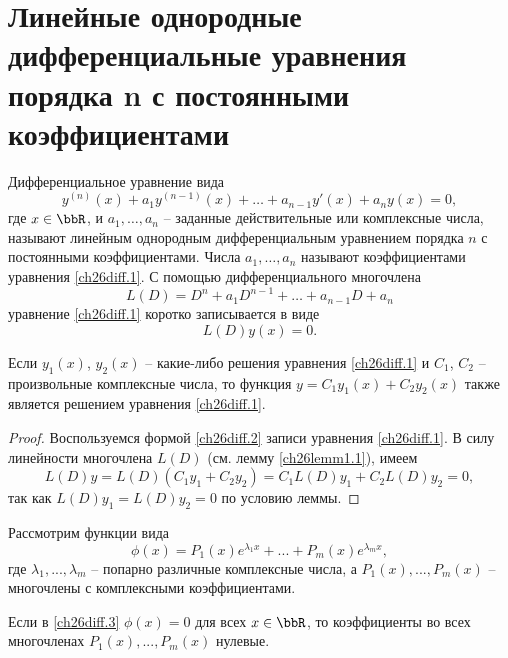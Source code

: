 \section{Линейные однородные дифференциальные уравнения порядка n с постоянными коэффициентами}

Дифференциальное уравнение вида
\begin{equation}\label{ch26diff.1}
y^{(n)}(x)+a_1y^{(n-1)}(x)+\dots+a_{n-1}y'(x)+a_ny(x)=0,
\end{equation}
где $x\in \bbR$, и $a_1,\dots,a_n$ -- заданные действительные или комплексные числа, называют линейным однородным дифференциальным уравнением порядка $n$ с постоянными коэффициентами. Числа $a_1,\dots,a_n$ называют коэффициентами уравнения \eqref{ch26diff.1}.
С помощью дифференциального многочлена 
$$
L(D)= D^n+a_1D^{n-1}+\dots+a_{n-1}D+a_n
$$
уравнение \eqref{ch26diff.1} коротко записывается в виде
\begin{equation} \label{ch26diff.2}
L(D)y(x)=0.
\end{equation} 

\begin{lemm} \label{ch26lemm2.1}
Если $y_1(x)$, $y_2(x)$ -- какие-либо решения уравнения \eqref{ch26diff.1}  и $C_1$, $C_2$ -- произвольные комплексные числа, то функция $y=C_1y_1(x)+C_2y_2(x)$ также является решением уравнения \eqref{ch26diff.1}.
\end{lemm}

\begin{proof}
Воспользуемся формой \eqref{ch26diff.2} записи уравнения \eqref{ch26diff.1}. В силу линейности многочлена $L(D)$ (см. лемму \ref{ch26lemm1.1}), имеем
$$
L(D)y=L(D)(C_1y_1+C_2y_2)=C_1L(D)y_1+C_2L(D)y_2=0,
$$
так как $L(D)y_1=L(D)y_2=0$ по условию леммы.
\end{proof}

Рассмотрим функции вида
\begin{equation} \label{ch26diff.3}
\phi(x)=P_1(x)e^{\lambda_1x}+...+P_m(x)e^{\lambda_mx},
\end{equation}
где $\lambda_1,...,\lambda_m$ -- попарно различные комплексные числа, а $P_1(x),...,P_m(x)$ -- многочлены с комплексными коэффициентами.


\begin{lemm}\label{ch26lemm2.2}
Если в \eqref{ch26diff.3} $\phi(x)=0$ для всех $x \in \bbR$, то коэффициенты во всех многочленах $P_1(x),...,P_m(x)$ нулевые.
\end{lemm}



